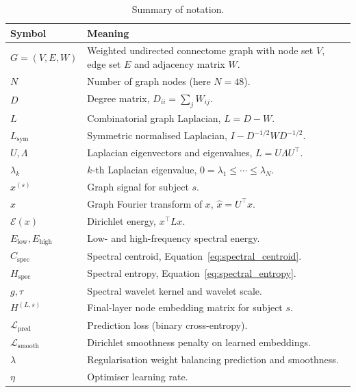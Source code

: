 \documentclass[11pt,reqno]{amsart}
\theoremstyle{plain}
\theoremstyle{definition}
\theoremstyle{remark}
\numberwithin{equation}{section}
\newcommand{\Elow}{E_{\mathrm{low}}}
\newcommand{\Ehigh}{E_{\mathrm{high}}}
\newcommand{\Cspec}{C_{\mathrm{spec}}}
\newcommand{\Hspec}{H_{\mathrm{spec}}}
\newcommand{\Lsym}{L_{\mathrm{sym}}}
\newcommand{\Lpred}{\mathcal{L}_{\mathrm{pred}}}
\newcommand{\Lsmooth}{\mathcal{L}_{\mathrm{smooth}}}
\begin{document}
\begin{table}[tbp]
    \centering
    \caption{Summary of notation.}
    \label{tab:notation}
    \small
    \begin{tabularx}{\textwidth}{@{}l L@{}}
        \toprule
        \textbf{Symbol} & \textbf{Meaning} \\
        \midrule
        $G=(V,E,W)$ & Weighted undirected connectome graph with node set $V$,
          edge set $E$ and adjacency matrix $W$. \\
        $N$ & Number of graph nodes (here $N=48$). \\
        $D$ & Degree matrix, $D_{ii}=\sum_j W_{ij}$. \\
        $L$ & Combinatorial graph Laplacian, $L=D-W$. \\
        $\Lsym$ & Symmetric normalised Laplacian, $I-D^{-1/2}WD^{-1/2}$. \\
        $U,\Lambda$ & Laplacian eigenvectors and eigenvalues, $L=U\Lambda U^{\top}$. \\
        $\lambda_k$ & $k$-th Laplacian eigenvalue, $0=\lambda_1\le\cdots\le\lambda_N$. \\
        $x^{(s)}$ & Graph signal for subject $s$. \\
        $\hat x$ & Graph Fourier transform of $x$, $\hat x = U^{\top} x$. \\
        $\mathcal{E}(x)$ & Dirichlet energy, $x^{\top} L x$. \\
        $\Elow,\Ehigh$ & Low- and high-frequency spectral energy. \\
        $\Cspec$ & Spectral centroid, Equation~\eqref{eq:spectral_centroid}. \\
        $\Hspec$ & Spectral entropy, Equation~\eqref{eq:spectral_entropy}. \\
        $g,\tau$ & Spectral wavelet kernel and wavelet scale. \\
        $H^{(L,s)}$ & Final-layer node embedding matrix for subject $s$. \\
        $\Lpred$ & Prediction loss (binary cross-entropy). \\
        $\Lsmooth$ & Dirichlet smoothness penalty on learned embeddings. \\
        $\lambda$ & Regularisation weight balancing prediction and smoothness. \\
        $\eta$ & Optimiser learning rate. \\
        \bottomrule
    \end{tabularx}
\end{table}

\FloatBarrier

\printbibliography
\end{document}
